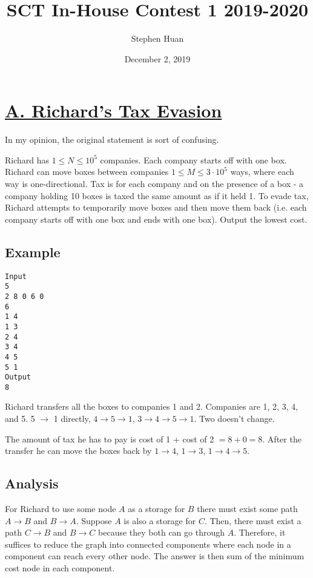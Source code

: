 \documentclass[11pt, oneside]{article}
\title{SCT In-House Contest 1 2019-2020}
\author{Stephen Huan}
\date{December 2, 2019}
\begin{document}
\maketitle

\section{\href{https://codeforces.com/group/M4wsRWBHyZ/contest/259141/problem/A}{A. Richard's Tax Evasion}}
In my opinion, the original statement is sort of confusing.

Richard has \( 1 \leq N \leq 10^5 \) companies. Each company starts off with one box.
Richard can move boxes between companies \( 1 \leq M \leq 3 \cdot 10^5 \) ways, where each way is one-directional.
Tax is for each company and on the presence of a box - a company holding 10 boxes is taxed the same amount
as if it held 1. To evade tax, Richard attempts to temporarily move boxes and then move them back (i.e. each company starts off with one box and ends with one box). Output the lowest cost.

\subsection{Example}
\begin{verbatim}
Input
5
2 8 0 6 0
6
1 4
1 3
2 4
3 4
4 5
5 1
Output
8
\end{verbatim}

Richard transfers all the boxes to companies 1 and 2.
Companies are 1, 2, 3, 4, and 5.
5 \( \rightarrow \) 1 directly, \( 4 \rightarrow 5 \rightarrow 1 \),
\( 3 \rightarrow 4 \rightarrow 5 \rightarrow 1 \). Two doesn't change.

The amount of tax he has to pay is cost of 1 + cost of 2 \( = 8 + 0 = 8 \).
After the transfer he can move the boxes back by \( 1 \rightarrow 4 \),
\( 1 \rightarrow 3 \), \( 1 \rightarrow 4 \rightarrow 5 \).

\subsection{Analysis}

For Richard to use some node \( A \) as a storage for \( B \) there must exist some
path \( A \rightarrow B \) and \( B \rightarrow A \). Suppose \( A \) is also a storage
for \( C \). Then, there must exist a path \( C \rightarrow B \) and \( B \rightarrow C \)
because they both can go through \( A \). Therefore, it suffices to reduce the graph into connected components
where each node in a component can reach every other node. The answer is then sum of the minimum cost
node in each component.
\end{document}
